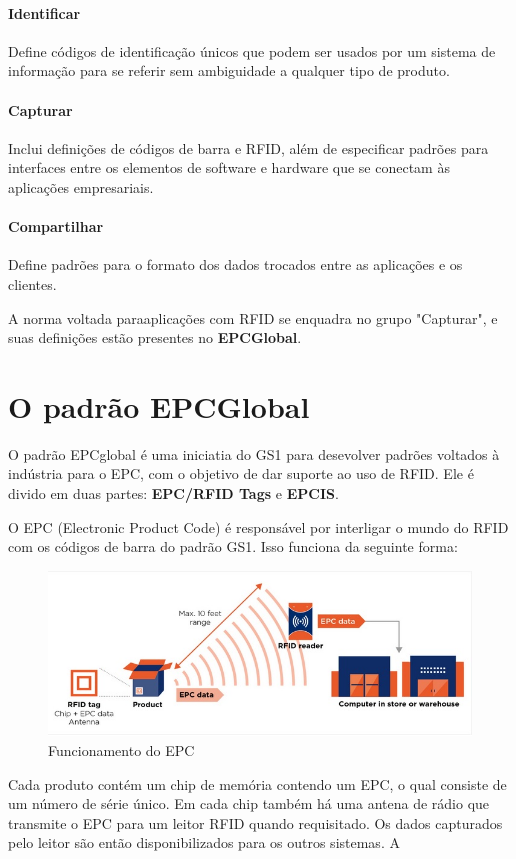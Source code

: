 \documentclass[a4paper,12pt,titlepage]{article}
\begin{document}
	\paragraph{Identificar} Define códigos de identificação únicos que podem ser usados por um sistema de informação para se referir sem ambiguidade a qualquer tipo de produto.
	\paragraph{Capturar} Inclui definições de códigos de barra e RFID, além de especificar padrões para interfaces entre os elementos de software e hardware que se conectam às aplicações empresariais.
	\paragraph{Compartilhar} Define padrões para o formato dos dados trocados entre as aplicações e os clientes.     

	A norma voltada paraaplicações com RFID se enquadra no grupo "Capturar", e suas definições estão presentes no \textbf{EPCGlobal}.


\section{O padrão EPCGlobal}
	O padrão EPCglobal é uma iniciatia do GS1 para desevolver padrões voltados à indústria para o EPC, com o objetivo de dar suporte ao uso de RFID. Ele é divido em duas partes: \textbf{EPC/RFID Tags} e \textbf{EPCIS}. 
	
	O EPC (Electronic Product Code) é responsável por interligar o mundo do RFID com os códigos de barra do padrão GS1. Isso funciona da seguinte forma:
		\begin{figure}[h!]
			\centering
			\includegraphics[width=0.5\linewidth]{epcrfid}
			\caption{Funcionamento do EPC}
			\label{fig:epcrfid}
		\end{figure}
	
	Cada produto contém um chip de memória contendo um EPC, o qual consiste de um número de série único. Em cada chip também há uma antena de rádio que transmite o EPC para um leitor RFID quando requisitado. Os dados capturados pelo leitor são então disponibilizados para os outros sistemas. A
	
\end{document}
